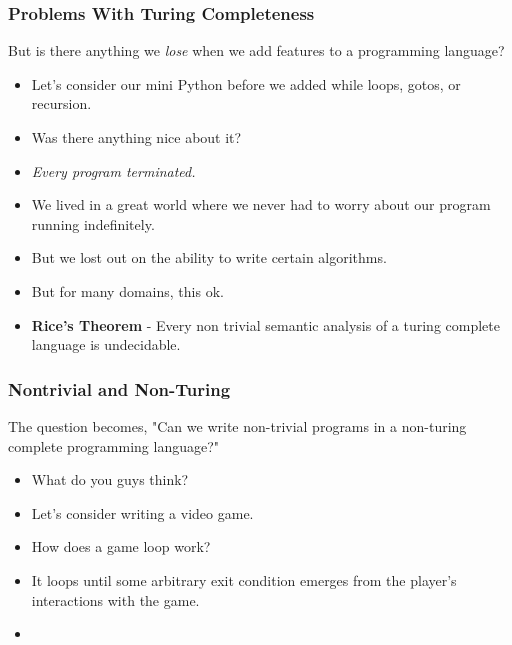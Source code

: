 \documentclass{beamer}
\begin{document}
\begin{frame}
  \frametitle{Problems With Turing Completeness}
  But is there anything we \emph{lose} when we add features to a programming language?
  \begin{itemize}
  \item<2-> Let's consider our mini Python before we added while loops, gotos, or recursion.
  \item<3-> Was there anything nice about it?
  \item<4-> \emph{Every program terminated.}
  \item<5-> We lived in a great world where we never had to worry about our program running indefinitely.
  \item<6-> But we lost out on the ability to write certain algorithms.
  \item<7-> But for many domains, this ok.
  \item<8-> \textbf{Rice's Theorem} - Every non trivial semantic analysis of a turing complete language is undecidable.
  \end{itemize}  
\end{frame}



\begin{frame}
  \frametitle{Nontrivial and Non-Turing}
  The question becomes, "Can we write non-trivial programs in a non-turing complete programming language?"
  \begin{itemize}
  \item<2-> What do you guys think?
  \item<3-> Let's consider writing a video game.
  \item<4-> How does a game loop work?
  \item<5-> It loops until some arbitrary exit condition emerges from the player's interactions with the game.
  \item<6-> \gameLoop  
  \end{itemize}
\end{frame}
\end{document}
